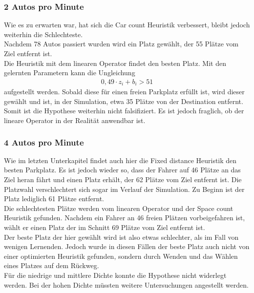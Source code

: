 \subsubsection{2 Autos pro Minute}

Wie es zu erwarten war, hat sich die Car count Heuristik verbessert, bleibt jedoch weiterhin die Schlechteste.\\
Nachdem 78 Autos passiert wurden wird ein Platz gewählt, der 55 Plätze vom Ziel entfernt ist.\\
Die Heuristik mit dem linearen Operator findet den besten Platz. 
Mit den gelernten Parametern kann die Ungleichung 
\begin{align}
0,49\cdot z_i+b_i > 51
\end{align} aufgestellt werden. Sobald diese für einen freien Parkplatz erfüllt ist, wird dieser gewählt und ist, in der Simulation, etwa 35 Plätze von der Destination entfernt.\\
Somit ist die Hypothese weiterhin nicht falsifiziert. Es ist jedoch fraglich, ob der lineare Operator in der Realität anwendbar ist. \\

\subsubsection{4 Autos pro Minute}

Wie im letzten Unterkapitel findet auch hier die Fixed distance Heuristik den besten Parkplatz.
Es ist jedoch wieder so, dass der Fahrer auf 46 Plätze an das Ziel heran fährt und einen Platz erhält, der 62 Plätze vom Ziel entfernt ist. Die Platzwahl verschlechtert sich sogar im Verlauf der Simulation. Zu Beginn ist der Platz lediglich 61 Plätze entfernt.\\
Die schlechtesten Plätze werden vom linearen Operator %
und der Space count Heuristik gefunden.
Nachdem ein Fahrer an 46 freien Plätzen vorbeigefahren ist, wählt er einen Platz der im Schnitt 69 Plätze vom Ziel entfernt ist.\\

Der beste Platz der hier gewählt wird ist also etwas schlechter, als im Fall von wenigen Lernenden. Jedoch wurde in diesen Fällen der beste Platz auch nicht von einer optimierten Heuristik gefunden, sondern durch Wenden und das Wählen eines Platzes auf dem Rückweg.\\
Für die niedrige und mittlere Dichte konnte die Hypothese nicht widerlegt werden. Bei der hohen Dichte müssten weitere Untersuchungen angestellt werden.

